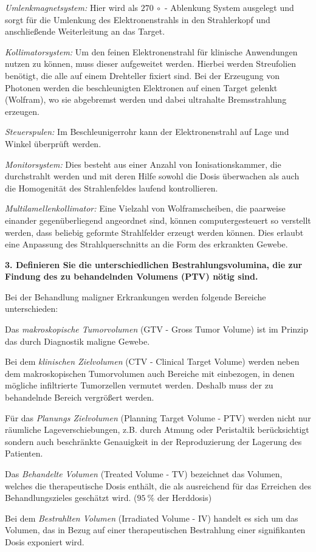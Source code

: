 \textit{Umlenkmagnetsystem:} Hier wird als $\SI{270}{\circ}$ - Ablenkung System ausgelegt und sorgt für die Umlenkung des Elektronenstrahls in den Strahlerkopf und anschließende Weiterleitung an das Target.  

\textit{Kollimatorsystem:} Um den feinen Elektronenstrahl für klinische Anwendungen nutzen zu können, muss dieser aufgeweitet werden. Hierbei werden Streufolien benötigt, die alle auf einem Drehteller fixiert sind. Bei der Erzeugung von Photonen werden die beschleunigten Elektronen auf einen Target gelenkt (Wolfram), wo sie abgebremst werden und dabei ultrahalte Bremsstrahlung erzeugen.

\textit{Steuerspulen:} Im Beschleunigerrohr kann der Elektronenstrahl auf Lage und Winkel überprüft werden.

\textit{Monitorsystem:} Dies besteht aus einer Anzahl von Ionisationskammer, die durchstrahlt werden und mit deren Hilfe sowohl die Dosis überwachen als auch die Homogenität des Strahlenfeldes laufend kontrollieren.  

\textit{Multilamellenkollimator:} Eine Vielzahl von Wolframscheiben, die paarweise einander gegenüberliegend angeordnet sind, können computergesteuert so verstellt werden, dass beliebig geformte Strahlfelder erzeugt werden können. Dies erlaubt eine Anpassung des Strahlquerschnitts an die Form des erkrankten Gewebe. 


\textbf{3. Definieren Sie die unterschiedlichen Bestrahlungsvolumina, die zur Findung des zu behandelnden Volumens (PTV) nötig sind.}

Bei der Behandlung maligner Erkrankungen werden folgende Bereiche unterschieden:

Das \textit{makroskopische Tumorvolumen} (GTV - Gross Tumor Volume) ist im Prinzip das durch Diagnostik maligne Gewebe. 

Bei dem \textit{klinischen Zielvolumen} (CTV - Clinical Target Volume) werden neben dem makroskopischen Tumorvolumen auch Bereiche mit einbezogen, in denen mögliche infiltrierte Tumorzellen vermutet werden.
Deshalb muss der zu behandelnde Bereich vergrößert werden.

Für das \textit{Planungs Zielvolumen} (Planning Target Volume - PTV) werden nicht nur räumliche Lageverschiebungen, z.B. durch Atmung oder Peristaltik berücksichtigt sondern auch beschränkte Genauigkeit in der Reproduzierung der Lagerung des Patienten. 

Das \textit{Behandelte Volumen} (Treated Volume - TV) bezeichnet das Volumen, welches die therapeutische Dosis enthält, die als ausreichend für das Erreichen des Behandlungszieles geschätzt wird. ($\SI{95}{\percent}$ der Herddosis)

Bei dem \textit{Bestrahlten Volumen} (Irradiated Volume - IV) handelt es sich um das Volumen, das in Bezug auf einer therapeutischen Bestrahlung einer signifikanten Dosis exponiert wird.

